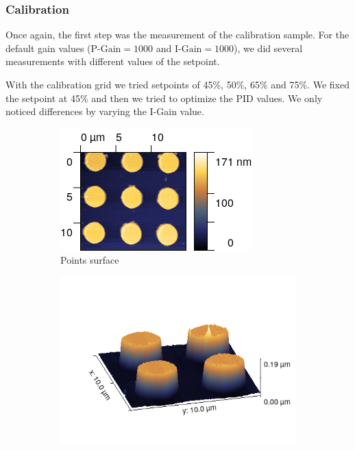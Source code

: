 \documentclass[11pt,a4paper]{article}
\begin{document}
\subsubsection{Calibration}
Once again, the first step was the measurement of the calibration sample. For the default gain values ($\text{P-Gain}=1000$ and $\text{I-Gain}=1000$), we did several measurements with different values of the setpoint.

With the calibration grid we tried setpoints of 45\%, 50\%, 65\% and 75\%. We fixed the setpoint at 45\% and then we tried to optimize the PID values. We only noticed differences by varying the I-Gain value.


\begin{figure}[H]
\centering
\begin{subfigure}[b]{0.45\textwidth}
\includegraphics[width=\textwidth]{tm_points}
\caption{Points surface}
\label{fig:}
\end{subfigure}
\begin{subfigure}[b]{0.45\textwidth}
\includegraphics[width=\textwidth]{tm_points_3D}

\end{subfigure}
\end{figure}
\end{document}
